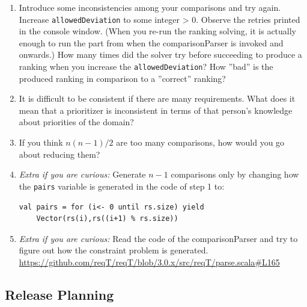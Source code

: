 \documentclass[11pt]{article}
\begin{document}
\begin{framed}
\begin{enumerate}
\vspace{1em}
\item Introduce some inconsistencies among your comparisons and try again. Increase \verb+allowedDeviation+ to some integer > 0. Observe the retries printed in the console window. (When you re-run the ranking solving, it is actually enough to run the part from when the comparisonParser is invoked and onwards.) How many times did the solver try before succeeding to produce a ranking when you increase the \verb+allowedDeviation+? How ''bad'' is the produced ranking in comparison to a ''correct'' ranking?
\vspace{4em}
\item It is difficult to be consistent if there are many requirements. What does it mean that a prioritizer is inconsistent in terms of that person's knowledge about priorities of the domain?
\vspace{4em}
\item If you think $n(n-1)/2$ are too many comparisons, how would you go about reducing them?
 \vspace{3em}
\item {\it Extra if you are curious:} Generate $n-1$ comparisons only by changing how the \verb+pairs+ variable is generated in the code of step 1 to:
\begin{lstlisting}
val pairs = for (i<- 0 until rs.size) yield 
    Vector(rs(i),rs((i+1) % rs.size)) 
\end{lstlisting}
\item {\it Extra if you are curious:} Read the code of the comparisonParser and try to figure out how the constraint problem is generated. \url{https://github.com/reqT/reqT/blob/3.0.x/src/reqT/parse.scala#L165} 
\end{enumerate}

\end{framed}

\clearpage\newpage

\subsection{Release Planning}
\end{document}
